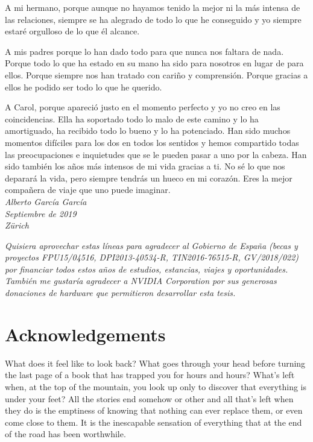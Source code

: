 A mi hermano, porque aunque no hayamos tenido la mejor ni la más intensa de las relaciones, siempre se ha alegrado de todo lo que he conseguido y yo siempre estaré orgulloso de lo que él alcance.

A mis padres porque lo han dado todo para que nunca nos faltara de nada. Porque todo lo que ha estado en su mano ha sido para nosotros en lugar de para ellos. Porque siempre nos han tratado con cariño y comprensión. Porque gracias a ellos he podido ser todo lo que he querido.

A Carol, porque apareció justo en el momento perfecto y yo no creo en las coincidencias. Ella ha soportado todo lo malo de este camino y lo ha amortiguado, ha recibido todo lo bueno y lo ha potenciado. Han sido muchos momentos difíciles para los dos en todos los sentidos y hemos compartido todas las preocupaciones e inquietudes que se le pueden pasar a uno por la cabeza. Han sido también los años más intensos de mi vida gracias a ti. No sé lo que nos deparará la vida, pero siempre tendrás un hueco en mi corazón. Eres la mejor compañera de viaje que uno puede imaginar.\\

\noindent\emph{Alberto García García}\\
\emph{Septiembre de 2019}\\
\emph{Zürich}\\

\vfill

\emph{Quisiera aprovechar estas líneas para agradecer al Gobierno de España (becas y proyectos FPU15/04516, DPI2013-40534-R, TIN2016-76515-R, GV/2018/022) por financiar todos estos años de estudios, estancias, viajes y oportunidades. También me gustaría agradecer a NVIDIA Corporation por sus generosas donaciones de hardware que permitieron desarrollar esta tesis.}\\

\chapter{Acknowledgements}

What does it feel like to look back? What goes through your head before turning the last page of a book that has trapped you for hours and hours? What's left when, at the top of the mountain, you look up only to discover that everything is under your feet? All the stories end somehow or other and all that's left when they do is the emptiness of knowing that nothing can ever replace them, or even come close to them. It is the inescapable sensation of everything that at the end of the road has been worthwhile.

